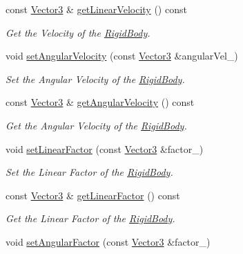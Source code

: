\begin{DoxyCompactItemize}
const \hyperlink{class_i_dream_sky_1_1_vector3}{Vector3} \& \hyperlink{class_i_dream_sky_1_1_physics3_1_1_rigid_body_a1f48fa3807c3ecdb4a8bfc382d456023}{get\+Linear\+Velocity} () const 
\begin{DoxyCompactList}\small\item\em Get the Velocity of the \hyperlink{class_i_dream_sky_1_1_physics3_1_1_rigid_body}{Rigid\+Body}. \end{DoxyCompactList}\item 
void \hyperlink{class_i_dream_sky_1_1_physics3_1_1_rigid_body_a9d485613dca6a54b3eb3adffda0d212a}{set\+Angular\+Velocity} (const \hyperlink{class_i_dream_sky_1_1_vector3}{Vector3} \&angular\+Vel\+\_\+)
\begin{DoxyCompactList}\small\item\em Set the Angular Velocity of the \hyperlink{class_i_dream_sky_1_1_physics3_1_1_rigid_body}{Rigid\+Body}. \end{DoxyCompactList}\item 
const \hyperlink{class_i_dream_sky_1_1_vector3}{Vector3} \& \hyperlink{class_i_dream_sky_1_1_physics3_1_1_rigid_body_a3262511aa29767d58486286a18180721}{get\+Angular\+Velocity} () const 
\begin{DoxyCompactList}\small\item\em Get the Angular Velocity of the \hyperlink{class_i_dream_sky_1_1_physics3_1_1_rigid_body}{Rigid\+Body}. \end{DoxyCompactList}\item 
void \hyperlink{class_i_dream_sky_1_1_physics3_1_1_rigid_body_a4ec719c23ab1c90fa9522d5128b6f628}{set\+Linear\+Factor} (const \hyperlink{class_i_dream_sky_1_1_vector3}{Vector3} \&factor\+\_\+)
\begin{DoxyCompactList}\small\item\em Set the Linear Factor of the \hyperlink{class_i_dream_sky_1_1_physics3_1_1_rigid_body}{Rigid\+Body}. \end{DoxyCompactList}\item 
const \hyperlink{class_i_dream_sky_1_1_vector3}{Vector3} \& \hyperlink{class_i_dream_sky_1_1_physics3_1_1_rigid_body_a0e146f328579ca963a8e2b0c151ab168}{get\+Linear\+Factor} () const 
\begin{DoxyCompactList}\small\item\em Get the Linear Factor of the \hyperlink{class_i_dream_sky_1_1_physics3_1_1_rigid_body}{Rigid\+Body}. \end{DoxyCompactList}\item 
void \hyperlink{class_i_dream_sky_1_1_physics3_1_1_rigid_body_abdf7ba04d15122d05f06bea761fa1166}{set\+Angular\+Factor} (const \hyperlink{class_i_dream_sky_1_1_vector3}{Vector3} \&factor\+\_\+)

\end{DoxyCompactItemize}
